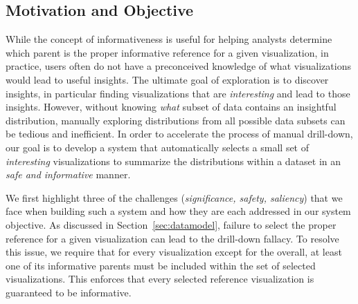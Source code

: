 \subsection{Motivation and Objective}
While the concept of informativeness is useful for helping analysts determine which parent is the proper informative reference for a given visualization, in practice, users often do not have a preconceived knowledge of what visualizations would lead to useful insights. The ultimate goal of exploration is to discover insights, in particular finding visualizations that are \textit{interesting} and lead to those insights. %
However, without knowing \textit{what} subset of data contains an insightful distribution, manually exploring distributions from all possible data subsets can be tedious and inefficient. In order to accelerate the process of manual drill-down, our goal is to develop a system that automatically selects a small set of \textit{interesting} visualizations to summarize the distributions within a dataset in an \textit{safe and informative} manner.
\par We first highlight three of the challenges (\textit{significance, safety, saliency}) that we face when building such a system and how they are each addressed in our system objective.
 As discussed in Section~\ref{sec:datamodel}, failure to select the proper reference for a given visualization can lead to the drill-down fallacy. To resolve this issue, we require that for every visualization except for the overall, at least one of its informative parents must be included within the set of selected visualizations. This enforces that every selected reference visualization is guaranteed to be informative. %
